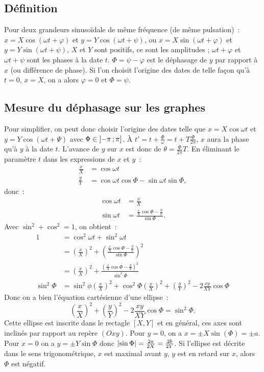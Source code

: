 \subsection{Définition}
Pour deux grandeurs sinusoïdale de même fréquence (de même 
pulsation)~: \(x = X\cos(\omega t + \varphi)\) et \(y = 
Y\cos(\omega t + \psi)\), ou \(x = X\sin(\omega t + \varphi)\) et 
\(y = Y\sin(\omega t + \psi)\), \(X\) et \(Y\) sont positifs, ce 
sont les amplitudes ; \(\omega t + \varphi\) et \(\omega t + \psi\) 
sont les phases à la date \(t\). \(\Phi = \psi -\varphi\) est le 
déphasage de \(y\) par rapport à \(x\) (ou différence de phase).
Si l'on choisit l'origine des dates de telle façon qu'à \(t=0\), 
\(x=X\), on a alors \(\varphi=0\) et \(\Phi = \psi\).
\subsection{Mesure du déphasage sur les graphes}
Pour simplifier, on peut donc choisir l'origine des dates telle que 
\(x = X\cos \omega t\) et \(y=Y\cos(\omega t + \Psi)\) avec \(\Phi 
\in \left] -\pi \, ;  \pi \right]\). À \(t' = t + \frac{\Phi}{\omega} = 
t + T\frac{\Phi}{2\pi}\), \(x\) aura la phase qu'à \(y\) à la date 
\(t\). L'avance de \(y\) sur \(x\) est donc de \(\theta = 
\frac{\Phi}{2\pi} T\).
En éliminant le paramètre \(t\) dans les expressions de \(x\) et 
\(y\)~:
\begin{align}
  \frac{x}{X} &= \cos\omega t \\
  \frac{y}{Y} &= \cos\omega t \cos\Phi -\sin\omega t \sin\Phi,
\end{align}
donc~:
\begin{align}
  \cos\omega t &= \frac{x}{X} \\
  \sin\omega t &= \frac{\frac{x}{X}\cos\Phi - 
  \frac{y}{Y}}{\sin\Phi}.
\end{align}
Avec \(\sin^2+\cos^2=1\), on obtient~:
\begin{align}
  1 &= \cos^2\omega t + \sin^2\omega t \\
  &= \left(\frac{x}{X}\right)^2 + \left( 
  \frac{\frac{x}{X}\cos\Phi - \frac{y}{Y}}{\sin\Phi} \right)^2 
  \\
  &= \left(\frac{x}{X}\right)^2 + \frac{(\frac{x}{X}\cos\Phi - 
  \frac{y}{Y})^2}{\sin^2\Phi} \\
  \sin^2\Phi &= \sin^2\phi \left(\frac{x}{X}\right)^2 + \cos^2\Phi 
  \left(\frac{x}{X}\right)^2 + \left(\frac{y}{Y}\right)^2 - 2 
  \frac{xy}{XY} \cos\Phi
\end{align}
Donc on a bien l'équation cartésienne d'une ellipse~:
\begin{equation}
  \left(\frac{x}{X}\right)^2 + \left(\frac{y}{Y}\right)^2 - 2 
  \frac{xy}{XY} \cos\Phi = \sin^2\Phi.
\end{equation}
Cette ellipse est inscrite dans le rectagle \([X, Y]\) et en 
général, ces axes sont inclinés par rapport au repère \((Oxy)\). 
Pour \(y=0\), on a \(x = \pm X\sin(\Phi) = \pm a\). Pour \(x=0\) on 
a \(y = \pm Y\sin\Phi\) donc \(\left\lvert\sin\Phi\right\rvert = \frac{2a}{2X} = 
\frac{2b}{2Y}\). Si l'ellipse est décrite dans le sens 
trigonométrique, \(x\) est maximal avant \(y\), \(y\) est en retard 
sur \(x\), alors \(\Phi\) est négatif.
